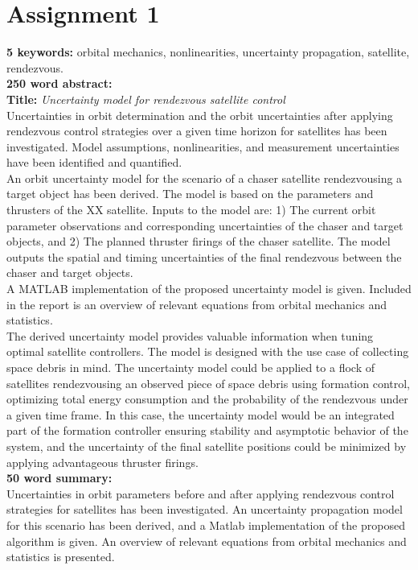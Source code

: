 \section*{Assignment 1}

\textbf{5 keywords:} orbital mechanics, nonlinearities, uncertainty propagation, satellite, rendezvous. \\

\textbf{250 word abstract:} \\
\textbf{Title: } \textit{Uncertainty model for rendezvous satellite control} \\

Uncertainties in orbit determination and the orbit uncertainties after applying rendezvous control strategies over a given time horizon for satellites has been investigated. Model assumptions, nonlinearities, and measurement uncertainties have been identified and quantified. \\

An orbit uncertainty model for the scenario of a chaser satellite rendezvousing a target object has been derived. The model is based on the parameters and thrusters of the XX satellite. Inputs to the model are: 1) The current orbit parameter observations and corresponding uncertainties of the chaser and target objects, and 2) The planned thruster firings of the chaser satellite. The model outputs the spatial and timing uncertainties of the final rendezvous between the chaser and target objects. \\

A MATLAB implementation of the proposed uncertainty model is given. Included in the report is an overview of relevant equations from orbital mechanics and statistics. \\

The derived uncertainty model provides valuable information when tuning optimal satellite controllers. The model is designed with the use case of collecting space debris in mind. The uncertainty model could be applied to a flock of satellites rendezvousing an observed piece of space debris using formation control, optimizing total energy consumption and the probability of the rendezvous under a given time frame. In this case, the uncertainty model would be an integrated part of the formation controller ensuring stability and asymptotic behavior of the system, and the uncertainty of the final satellite positions could be minimized by applying advantageous thruster firings. \\

\textbf{50 word summary:} \\
Uncertainties in orbit parameters before and after applying rendezvous control strategies for satellites has been investigated. An uncertainty propagation model for this scenario has been derived, and a Matlab implementation of the proposed algorithm is given. An overview of relevant equations from orbital mechanics and statistics is presented.

